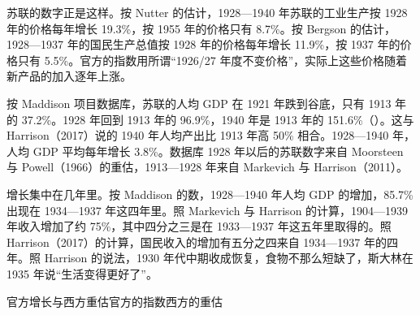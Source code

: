苏联的数字正是这样。按 Nutter 的估计，1928—1940 年苏联的工业生产按 1928 年的价格每年增长 19.3\%，按 1955 年的价格只有 8.7\%\cite{harrison1993}。按 Bergson 的估计，1928—1937 年的国民生产总值按 1928 年的价格每年增长 11.9\%，按 1937 年的价格只有 5.5\%\cite{harrison1993}。官方的指数用所谓“1926/27 年度不变价格”，实际上这些价格随着新产品的加入逐年上涨\cite{harrison1993}。


按 Maddison 项目数据库，苏联的人均 GDP 在 1921 年跌到谷底，只有 1913 年的 37.2\%\cite{mpd2023,boltvanzanden2024}。1928 年回到 1913 年的 96.9\%，1940 年是 1913 年的 151.6\%（）\cite{mpd2023}。这与 Harrison（2017）说的 1940 年人均产出比 1913 年高 50\% 相合\cite{harrison2017}。1928—1940 年，人均 GDP 平均每年增长 3.8\%\cite{mpd2023}。数据库 1928 年以后的苏联数字来自 Moorsteen 与 Powell（1966）的重估，1913—1928 年来自 Markevich 与 Harrison（2011）\cite{mpd31src}。

增长集中在几年里。按 Maddison 的数，1928—1940 年人均 GDP 的增加，85.7\% 出现在 1934—1937 年这四年里\cite{mpd2023}。照 Markevich 与 Harrison 的计算，1904—1939 年收入增加了约 75\%，其中四分之三是在 1933—1937 年这五年里取得的\cite{markevich2011}。照 Harrison（2017）的计算，国民收入的增加有五分之四来自 1934—1937 年的四年\cite{harrison2017}。照 Harrison 的说法，1930 年代中期收成恢复，食物不那么短缺了，斯大林在 1935 年说“生活变得更好了”\cite{harrison2017}。

\begin{compare}{官方增长与西方重估}{官方的指数}{西方的重估}
\end{compare}

